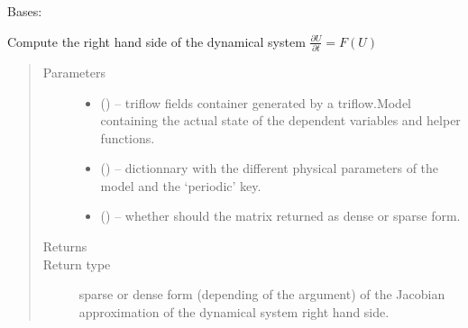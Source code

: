 \documentclass[letterpaper,10pt,english]{sphinxmanual}
\begin{document}
\begin{fulllineitems}
\label{\detokenize{triflow.core:triflow.core.routines.J_Routine}}
Bases: {\hyperref[\detokenize{triflow.core:triflow.core.routines.ModelRoutine}]{}}

Compute the right hand side of the dynamical system
\(\frac{\partial U}{\partial t} = F(U)\)
\begin{quote}\begin{description}
\item[{Parameters}] \leavevmode\begin{itemize}
\item {} 
 () -- triflow fields container generated by a triflow.Model containing the actual state of the dependent variables and helper functions.

\item {} 
 () -- dictionnary with the different physical parameters of the model and the `periodic' key.

\item {} 
 (\sphinxstyleliteralemphasis{, }\sphinxstyleliteralemphasis{, }) -- whether should the matrix returned as dense or sparse form.

\end{itemize}

\item[{Returns}] \leavevmode
{}

\item[{Return type}] \leavevmode
sparse or dense form (depending of the  argument) of the Jacobian approximation of the dynamical system right hand side.

\end{description}\end{quote}

\end{fulllineitems}

\end{document}
